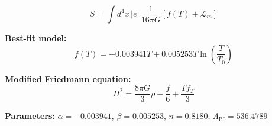 
\begin{equation}
  S = \int d^4x \, |e| \, \frac{1}{16\pi G} \left[ f(T) + \mathcal{L}_m \right]
\end{equation}

\textbf{Best-fit model:}
\begin{equation}
  f(T) = -0.003941 T + 0.005253 T \ln\!\left(\frac{T}{T_0}\right)
\end{equation}

\textbf{Modified Friedmann equation:}
\begin{equation}
  H^2 = \frac{8\pi G}{3} \rho - \frac{f}{6} + \frac{T f_T}{3}
\end{equation}

\textbf{Parameters:}
$\alpha = -0.003941$, \quad
$\beta = 0.005253$, \quad
$n = 0.8180$, \quad
$\Lambda_{\text{BI}} = 536.4789$